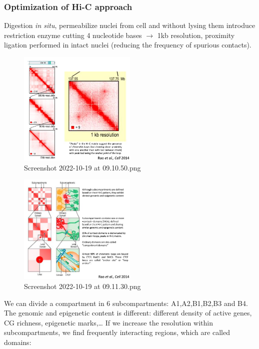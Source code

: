 \hypertarget{optimization-of-hi-c-approach}{%
\subsubsection{Optimization of Hi-C approach}\label{optimization-of-hi-c-approach}}

Digestion \emph{in situ}, permeabilize nuclei from cell and without lysing them introduce restriction enzyme cutting 4 nucleotide bases $\rightarrow$ 1kb resolution, proximity ligation performed in intact nuclei (reducing the frequency of spurious contacts).

\begin{figure}
\centering
\includegraphics[width=0.5\textwidth]{../_resources/Screenshot_2022-10-19_at_09-10-50.png}
\caption{Screenshot 2022-10-19 at 09.10.50.png}
\end{figure}

\begin{figure}
\centering
\includegraphics[width=0.5\textwidth]{../_resources/Screenshot_2022-10-19_at_09-11-30.png}
\caption{Screenshot 2022-10-19 at 09.11.30.png}
\end{figure}

We can divide a compartment in 6 subcompartments: A1,A2,B1,B2,B3 and B4. The genomic and epigenetic content is different: different density of active genes, CG richness, epigenetic marks,\ldots{} If we increase the resolution within subcompartments, we find frequently interacting regions, which are called domains:


